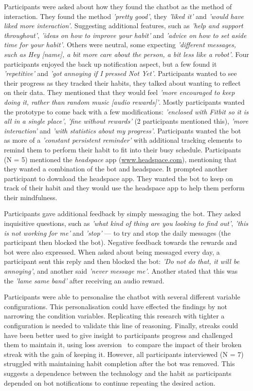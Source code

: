 \documentclass{scaffold/sigchi}
\begin{document}
Participants were asked about how they found the chatbot as the method of interaction. They found the method \textit{'pretty good'}, they \textit{'liked it'} and \textit{'would have liked more interaction'}. Suggesting additional features, such as \textit{'help and support throughout'}, \textit{'ideas on how to improve your habit'} and \textit{'advice on how to set aside time for your habit'}. Others were neutral, some expecting \textit{'different messages, such as Hey [name], a bit more care about the person, a bit less like a robot'}. Four participants enjoyed the back up notification aspect, but a few found it \textit{'repetitive'} and \textit{'got annoying if I pressed Not Yet'}. Participants wanted to see their progress as they tracked their habits, they talked about wanting to reflect on their data. They mentioned that they would feel \textit{'more encouraged to keep doing it, rather than random music [audio rewards]'}. Mostly participants wanted the prototype to come back with a few modifications: \textit{'enclosed with Fitbit so it is all in a single place'}, \textit{'fine without rewards'} (2 participants mentioned this), \textit{'more interaction'} and \textit{'with statistics about my progress'}. Participants wanted the bot as more of a \textit{'constant persistent reminder'} with additional tracking elements to remind them to perform their habit to fit into their busy schedule. Participants (N = 5) mentioned the \textit{headspace} app (\url{www.headspace.com}), mentioning that they wanted a combination of the bot and headspace. It prompted another participant to download the headspace app. They wanted the bot to keep on track of their habit and they would use the headspace app to help them perform their mindfulness.

Participants gave additional feedback by simply messaging the bot. They asked inquisitive questions, such as \textit{'what kind of thing are you looking to find out'}, \textit{'this is not working for me'} and \textit{'stop'} --- to try and stop the daily messages (the participant then blocked the bot). Negative feedback towards the rewards and bot were also expressed. When asked about being messaged every day, a participant sent this reply and then blocked the bot: \textit{'Do not do that, it will be annoying'}, and another said \textit{'never message me'}. Another stated that this was the \textit{'lame same band'} after receiving an audio reward.

Participants were able to personalise the chatbot with several different variable configurations. This personalisation could have effected the findings by not narrowing the condition variables. Replicating this research with tighter a configuration is needed to validate this line of reasoning. Finally, streaks could have been better used to give insight to participants progress and challenged them to maintain it, using loss aversion~\cite{loss_aversion} to compare the impact of their broken streak with the gain of keeping it. However, all participants interviewed (N = 7) struggled with maintaining habit completion after the bot was removed. This suggests a dependence between the technology and the habit as participants depended on bot notifications to continue repeating the desired action.
\end{document}

